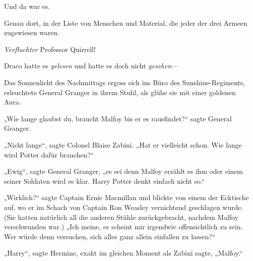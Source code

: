Und da war es.

Genau dort, in der Liste von Menschen und Material, die jeder der drei Armeen zugewiesen waren.

\emph{Verfluchter} Professor Quirrell!

Draco hatte es \emph{gelesen} und hatte es doch nicht \emph{gesehen}—

\later

Das Sonnenlicht des Nachmittags ergoss sich ins Büro des Sunshine-Regiments, erleuchtete General Granger in ihrem Stuhl, als glühe sie mit einer goldenen Aura.

„Wie lange glaubst du, braucht Malfoy bis er es rausfindet?“ sagte General Granger.

„Nicht lange“, sagte Colonel Blaise Zabini.
„Hat er vielleicht schon. Wie lange wird Potter dafür brauchen?“

„Ewig“, sagte General Granger, „es sei denn Malfoy erzählt es ihm oder einem seiner Soldaten wird es klar. Harry Potter denkt einfach nicht so.“

„Wirklich?“ sagte Captain Ernie Macmillan und blickte von einem der Ecktische auf, wo er im Schach von Captain Ron Weasley vernichtend geschlagen wurde. (Sie hatten natürlich all die anderen Stühle zurückgebracht, nachdem Malfoy verschwunden war.)
„Ich meine, es scheint mir irgendwie offensichtlich zu sein. Wer würde denn versuchen, sich alles ganz allein einfallen zu lassen?“

„Harry“, sagte Hermine, exakt im gleichen Moment als Zabini sagte,
„Malfoy.“

